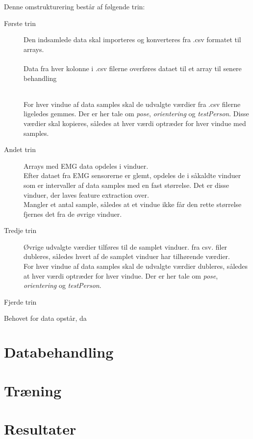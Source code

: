 Denne omstrukturering består af følgende trin:
\begin{description}
	\item[Første trin] Den indsamlede data skal importeres og konverteres fra .csv formatet til arrays.\\\\
		Data fra hver kolonne i .csv filerne overføres dataet til et array til senere behandling
		

	\\
	For hver vindue af data samples skal de udvalgte værdier fra .csv filerne ligeledes gemmes. Der er her tale om \textit{pose}, \textit{orientering} og \textit{testPerson}. Disse værdier skal kopieres, således at hver værdi optræder for hver vindue med samples.

  \item[Andet trin] Arrays med EMG data opdeles i vinduer. 
  \\
  Efter dataet fra EMG sensorerne er glemt, opdeles de i såkaldte vinduer som er intervaller af data samples med en fast størrelse. Det er disse vinduer, der laves feature extraction over.
  \\
  Mangler et antal sample, således at et vindue ikke får den rette størrelse fjernes det fra de øvrige vinduer.
    
    \item[Tredje trin] Øvrige udvalgte værdier tilføres til de samplet vinduer.
     fra csv. filer dubleres, således hvert af de samplet vinduer har tilhørende værdier.
  \\
  For hver vindue af data samples skal de udvalgte værdier dubleres, således at hver værdi optræder for hver vindue. Der er her tale om \textit{pose}, \textit{orientering} og \textit{testPerson}.
  
  \item[Fjerde trin] 
\end{description}



 Behovet for data opstår, da 


\section{Databehandling}

\section{Træning}

\section{Resultater}